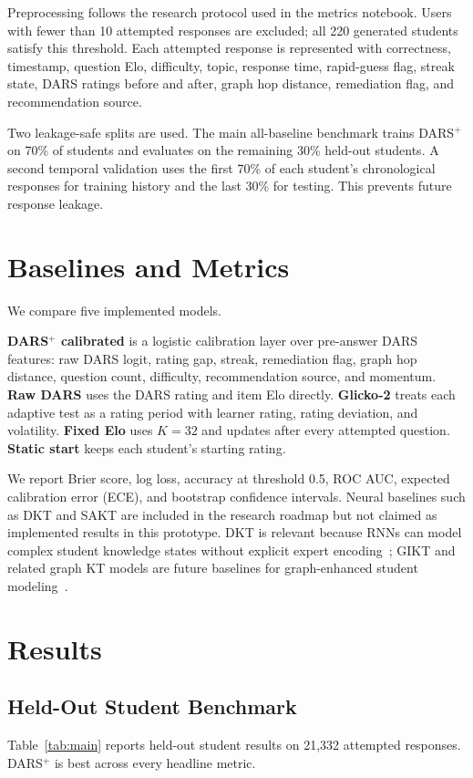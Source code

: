 \documentclass[sigconf,nonacm]{acmart}
\begin{document}
Preprocessing follows the research protocol used in the metrics notebook. Users with fewer than 10 attempted responses are excluded; all 220 generated students satisfy this threshold. Each attempted response is represented with correctness, timestamp, question Elo, difficulty, topic, response time, rapid-guess flag, streak state, DARS ratings before and after, graph hop distance, remediation flag, and recommendation source.

Two leakage-safe splits are used. The main all-baseline benchmark trains DARS$^+$ on 70\% of students and evaluates on the remaining 30\% held-out students. A second temporal validation uses the first 70\% of each student's chronological responses for training history and the last 30\% for testing. This prevents future response leakage.

\section{Baselines and Metrics}
We compare five implemented models.

\textbf{DARS$^+$ calibrated} is a logistic calibration layer over pre-answer DARS features: raw DARS logit, rating gap, streak, remediation flag, graph hop distance, question count, difficulty, recommendation source, and momentum. \textbf{Raw DARS} uses the DARS rating and item Elo directly. \textbf{Glicko-2} treats each adaptive test as a rating period with learner rating, rating deviation, and volatility. \textbf{Fixed Elo} uses $K=32$ and updates after every attempted question. \textbf{Static start} keeps each student's starting rating.

We report Brier score, log loss, accuracy at threshold 0.5, ROC AUC, expected calibration error (ECE), and bootstrap confidence intervals. Neural baselines such as DKT and SAKT are included in the research roadmap but not claimed as implemented results in this prototype. DKT is relevant because RNNs can model complex student knowledge states without explicit expert encoding~\cite{piech2015dkt}; GIKT and related graph KT models are future baselines for graph-enhanced student modeling~\cite{yang2020gikt}.

\section{Results}
\subsection{Held-Out Student Benchmark}
Table~\ref{tab:main} reports held-out student results on 21,332 attempted responses. DARS$^+$ is best across every headline metric.
\end{document}
